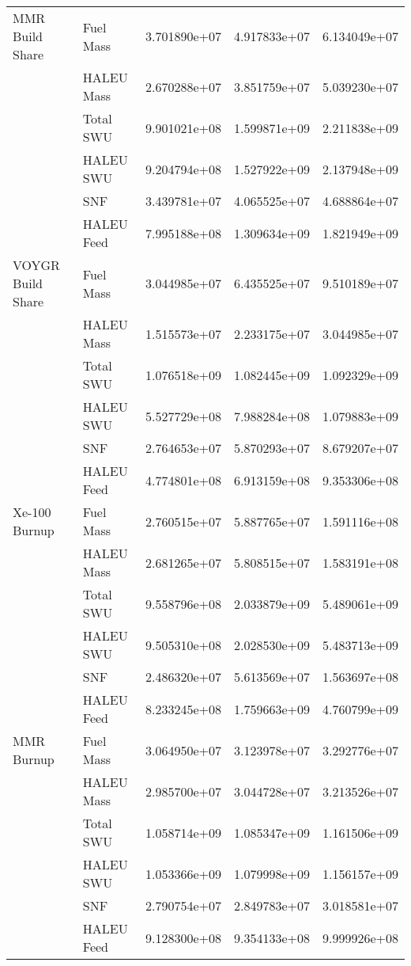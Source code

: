 \begin{table}
\begin{tabular}{llrrr}
        MMR Build Share &  Fuel Mass & 3.701890e+07 & 4.917833e+07 & 6.134049e+07 \\
                        & HALEU Mass & 2.670288e+07 & 3.851759e+07 & 5.039230e+07 \\
                        &  Total SWU & 9.901021e+08 & 1.599871e+09 & 2.211838e+09 \\
                        &  HALEU SWU & 9.204794e+08 & 1.527922e+09 & 2.137948e+09 \\
                        &        SNF & 3.439781e+07 & 4.065525e+07 & 4.688864e+07 \\
                        & HALEU Feed & 7.995188e+08 & 1.309634e+09 & 1.821949e+09 \\\hline 
        VOYGR Build Share &  Fuel Mass & 3.044985e+07 & 6.435525e+07 & 9.510189e+07 \\
                          & HALEU Mass & 1.515573e+07 & 2.233175e+07 & 3.044985e+07 \\
                          &  Total SWU & 1.076518e+09 & 1.082445e+09 & 1.092329e+09 \\
                          &  HALEU SWU & 5.527729e+08 & 7.988284e+08 & 1.079883e+09 \\
                          &        SNF & 2.764653e+07 & 5.870293e+07 & 8.679207e+07 \\
                          & HALEU Feed & 4.774801e+08 & 6.913159e+08 & 9.353306e+08 \\\hline 
        Xe-100 Burnup &  Fuel Mass & 2.760515e+07 & 5.887765e+07 & 1.591116e+08 \\
                      & HALEU Mass & 2.681265e+07 & 5.808515e+07 & 1.583191e+08 \\
                      &  Total SWU & 9.558796e+08 & 2.033879e+09 & 5.489061e+09 \\
                      &  HALEU SWU & 9.505310e+08 & 2.028530e+09 & 5.483713e+09 \\
                      &        SNF & 2.486320e+07 & 5.613569e+07 & 1.563697e+08 \\
                      & HALEU Feed & 8.233245e+08 & 1.759663e+09 & 4.760799e+09 \\\hline 
        MMR Burnup &  Fuel Mass & 3.064950e+07 & 3.123978e+07 & 3.292776e+07 \\
                   & HALEU Mass & 2.985700e+07 & 3.044728e+07 & 3.213526e+07 \\
                   &  Total SWU & 1.058714e+09 & 1.085347e+09 & 1.161506e+09 \\
                   &  HALEU SWU & 1.053366e+09 & 1.079998e+09 & 1.156157e+09 \\
                   &        SNF & 2.790754e+07 & 2.849783e+07 & 3.018581e+07 \\
                   & HALEU Feed & 9.128300e+08 & 9.354133e+08 & 9.999926e+08 \\
        \hline
    \end{tabular}
\end{table}


